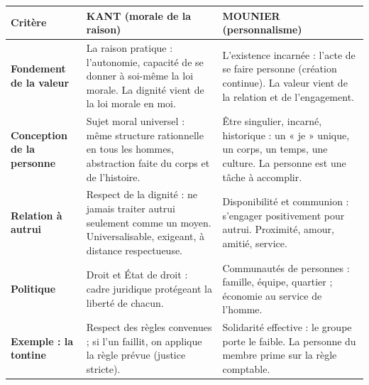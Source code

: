 \documentclass[11pt]{article}
\newcommand{\cle}[1]{{\popxbold\color{popdark}#1}}
\begin{document}
\begin{center}
\begin{tabularx}{\linewidth}{|l|X|X|}
\hline
\rowcolor{popblueL} \textbf{Critère} & \textbf{KANT (morale de la raison)} & \textbf{MOUNIER (personnalisme)} \\
\hline
\textbf{Fondement de la valeur} & La \cle{raison pratique} : l'autonomie, capacité de se donner à soi-même la loi morale. La dignité vient de la loi morale en moi. & L'\cle{existence incarnée} : l'acte de se faire personne (création continue). La valeur vient de la relation et de l'engagement. \\
\hline
\textbf{Conception de la personne} & \cle{Sujet moral universel} : même structure rationnelle en tous les hommes, abstraction faite du corps et de l'histoire. & \cle{Être singulier, incarné, historique} : un « je » unique, un corps, un temps, une culture. La personne est une tâche à accomplir. \\
\hline
\textbf{Relation à autrui} & \cle{Respect} de la dignité : ne jamais traiter autrui seulement comme un moyen. Universalisable, exigeant, à distance respectueuse. & \cle{Disponibilité} et \cle{communion} : s'engager positivement pour autrui. Proximité, amour, amitié, service. \\
\hline
\textbf{Politique} & \cle{Droit} et \cle{État de droit} : cadre juridique protégeant la liberté de chacun. & \cle{Communautés de personnes} : famille, équipe, quartier ; économie au service de l'homme. \\
\hline
\textbf{Exemple : la tontine} & Respect des règles convenues ; si l'un faillit, on applique la règle prévue (justice stricte). & Solidarité effective : le groupe porte le faible. La personne du membre prime sur la règle comptable. \\
\hline
\end{tabularx}
\end{center}
\end{document}
